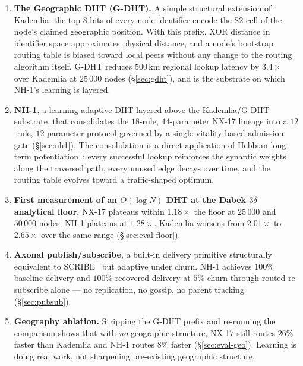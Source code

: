 \documentclass[conference]{IEEEtran}
\newcommand{\nhone}{NH-1\xspace}
\newcommand{\GDHT}{G-DHT\xspace}
\newcommand{\NXseventeen}{NX-17\xspace}
\begin{document}
\begin{enumerate}
\item \textbf{The Geographic DHT (\GDHT).} A simple structural extension
of Kademlia: the top $8$ bits of every node identifier encode the S2
cell of the node's claimed geographic position. With this prefix, XOR
distance in identifier space approximates physical distance, and a
node's bootstrap routing table is biased toward local peers without
any change to the routing algorithm itself. \GDHT reduces $500$\,km
regional lookup latency by $3.4\times$ over Kademlia at $25\,000$
nodes (\S\ref{sec:gdht}), and is the substrate on which \nhone's
learning is layered.

\item \textbf{\nhone}, a learning-adaptive DHT layered above the
Kademlia/\GDHT substrate, that consolidates the $18$-rule, $44$-parameter
\NXseventeen lineage into a $12$-rule, $12$-parameter protocol
governed by a single vitality-based admission gate (\S\ref{sec:nh1}).
The consolidation is a direct application of Hebbian long-term
potentiation~\cite{hebb1949organization,bliss1973long}: every
successful lookup reinforces the synaptic weights along the traversed
path, every unused edge decays over time, and the routing table
evolves toward a traffic-shaped optimum.

\item \textbf{First measurement of an $O(\log N)$ DHT at the Dabek
$3\delta$ analytical floor.} \NXseventeen plateaus within $1.18\times$
the floor at $25\,000$ and $50\,000$ nodes; \nhone plateaus at
$1.28\times$. Kademlia worsens from $2.01\times$ to $2.65\times$ over
the same range (\S\ref{sec:eval-floor}).

\item \textbf{Axonal publish/subscribe}, a built-in delivery primitive
structurally equivalent to SCRIBE~\cite{castro2002scribe} but adaptive
under churn. \nhone achieves $100\%$ baseline delivery and $100\%$
recovered delivery at $5\%$ churn through routed re-subscribe alone ---
no replication, no gossip, no parent tracking (\S\ref{sec:pubsub}).

\item \textbf{Geography ablation.} Stripping the \GDHT prefix and
re-running the comparison shows that with \emph{no} geographic
structure, \NXseventeen still routes $26\%$ faster than Kademlia and
\nhone routes $8\%$ faster (\S\ref{sec:eval-geo}). Learning is doing
real work, not sharpening pre-existing geographic structure.
\end{enumerate}
\end{document}
